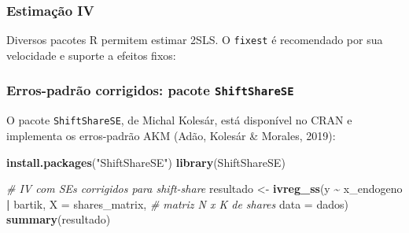 \documentclass[
]{article}
\newenvironment{Shaded}{\begin{snugshade}}{\end{snugshade}}
\newcommand{\AttributeTok}[1]{\textcolor[rgb]{0.13,0.29,0.53}{#1}}
\newcommand{\CommentTok}[1]{\textcolor[rgb]{0.56,0.35,0.01}{\textit{#1}}}
\newcommand{\FunctionTok}[1]{\textcolor[rgb]{0.13,0.29,0.53}{\textbf{#1}}}
\newcommand{\NormalTok}[1]{#1}
\newcommand{\OtherTok}[1]{\textcolor[rgb]{0.56,0.35,0.01}{#1}}
\newcommand{\SpecialCharTok}[1]{\textcolor[rgb]{0.81,0.36,0.00}{\textbf{#1}}}
\newcommand{\StringTok}[1]{\textcolor[rgb]{0.31,0.60,0.02}{#1}}
\begin{document}
\subsubsection{Estimação IV}\label{estimauxe7uxe3o-iv}

Diversos pacotes R permitem estimar 2SLS. O \texttt{fixest} é recomendado por sua velocidade e suporte a efeitos fixos:

\begin{Shaded}
\end{Shaded}

\subsubsection{\texorpdfstring{Erros-padrão corrigidos: pacote \texttt{ShiftShareSE}}{Erros-padrão corrigidos: pacote ShiftShareSE}}\label{erros-padruxe3o-corrigidos-pacote-shiftsharese}

O pacote \texttt{ShiftShareSE}, de Michal Kolesár, está disponível no CRAN e implementa os erros-padrão AKM (Adão, Kolesár \& Morales, 2019):

\begin{Shaded}
\begin{Highlighting}[]
\FunctionTok{install.packages}\NormalTok{(}\StringTok{"ShiftShareSE"}\NormalTok{)}
\FunctionTok{library}\NormalTok{(ShiftShareSE)}

\CommentTok{\# IV com SEs corrigidos para shift{-}share}
\NormalTok{resultado }\OtherTok{\textless{}{-}} \FunctionTok{ivreg\_ss}\NormalTok{(y }\SpecialCharTok{\textasciitilde{}}\NormalTok{ x\_endogeno }\SpecialCharTok{|}\NormalTok{ bartik,}
                       \AttributeTok{X =}\NormalTok{ shares\_matrix,    }\CommentTok{\# matriz N x K de shares}
                       \AttributeTok{data =}\NormalTok{ dados)}
\FunctionTok{summary}\NormalTok{(resultado)}
\end{Highlighting}
\end{Shaded}
\end{document}
